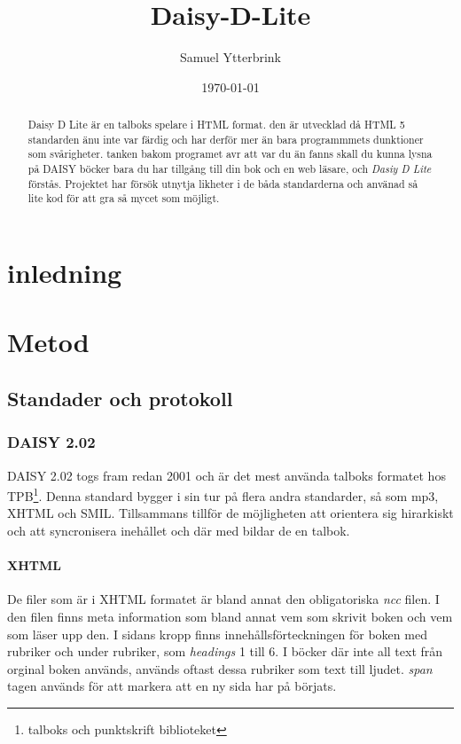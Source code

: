 \documentclass{article}
\begin{document}
\title{Daisy-D-Lite}
\author{Samuel Ytterbrink}
\date{\today}
\maketitle

\begin{abstract}
Daisy D Lite är en talboks spelare i HTML format.
den är utvecklad då HTML 5 standarden änu inte var färdig och har derför mer än bara programmmets dunktioner som svårigheter.
tanken bakom programet avr att var du än fanns skall du kunna lysna på DAISY böcker bara du har tillgång till din bok och en web läsare, och {\em Dasiy D Lite} förstås. 
Projektet har försök utnytja likheter i de båda standarderna och använad så lite kod för att gra så mycet som möjligt.
\end{abstract}

\section{inledning}

\section{Metod}

\subsection{Standader och protokoll}

\subsubsection{DAISY 2.02}
DAISY 2.02 togs fram redan 2001 och är det mest använda talboks formatet hos TPB\footnote{talboks och punktskrift biblioteket}. 
Denna standard bygger i sin tur på flera andra standarder, så som mp3, XHTML och SMIL.
Tillsammans tillför de möjligheten att orientera sig hirarkiskt och att syncronisera inehållet och där med bildar de en talbok.

\paragraph{XHTML}
De filer som är i XHTML formatet är bland annat den obligatoriska {\em ncc} filen.
I den filen finns meta information som bland annat vem som skrivit boken och vem som läser upp den.
I sidans kropp finns innehållsförteckningen för boken med rubriker och under rubriker, som {\em headings} 1 till 6.
I böcker där inte all text från orginal boken används, används oftast dessa rubriker som text till ljudet.
{\em span} tagen används för att markera att en ny sida har på börjats.
\end{document}

